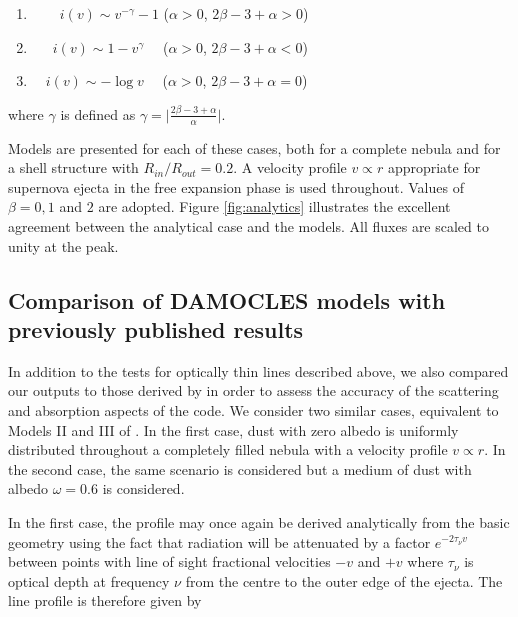\documentclass[useAMS,usenatbib,usegraphicx]{mnras}
\begin{document}
\begin{enumerate}\parskip3pt

	\item \ \ $\quad i(v)  \sim v^{-\gamma}-1$ \quad ($\alpha>0$, $2\beta-3+\alpha>0$)
	\item \ $\quad i(v)  \sim 1-v^\gamma$ \quad \ \ ($\alpha>0$, $2\beta-3+\alpha<0$)
	\item  $\quad i(v) \sim -\log v$ \quad \ \ ($\alpha>0$, $2\beta-3+\alpha=0$)

\end{enumerate}


\noindent where $\gamma$ is defined as $\gamma= \lvert 
\frac{2\beta-3+\alpha}{\alpha} \rvert$.

Models are presented for each of these cases, both for a 
complete nebula and for a shell structure with $R_{in}/R_{out}=0.2$.  
A velocity profile $v \propto r$ appropriate for supernova ejecta in the free 
expansion phase is used throughout.  Values of $\beta = 0, 1$ and $2$ are 
adopted.  Figure \ref{fig:analytics} illustrates the excellent agreement between 
the analytical case and the models.  All fluxes are scaled to unity at the peak.

\subsection{Comparison of DAMOCLES models with previously published results}
\label{opt_thick_testing}



In addition to the tests for optically thin lines described above, we also 
compared our outputs to those derived by \citet{Lucy1989} in order to 
assess the accuracy of the scattering and absorption aspects of the code.  
We consider two similar cases, equivalent to Models II and III of 
\citet{Lucy1989}. In the first case, dust with zero albedo is 
uniformly distributed throughout a completely filled nebula with a velocity profile 
$v \propto r$.  In the second case, the same scenario is considered but a 
medium of dust with albedo $\omega =0.6$ is considered.

In the first case, the profile may once again be derived analytically from 
the basic geometry using the fact that radiation will be attenuated by a 
factor $e^{-2\tau_{\nu} v}$ between points with line of sight fractional velocities $-v$ and 
$+v$ where $\tau_{\nu}$ is optical depth at frequency $\nu$ from the centre to the outer edge of the ejecta.  The line profile is therefore given by
\end{document}
